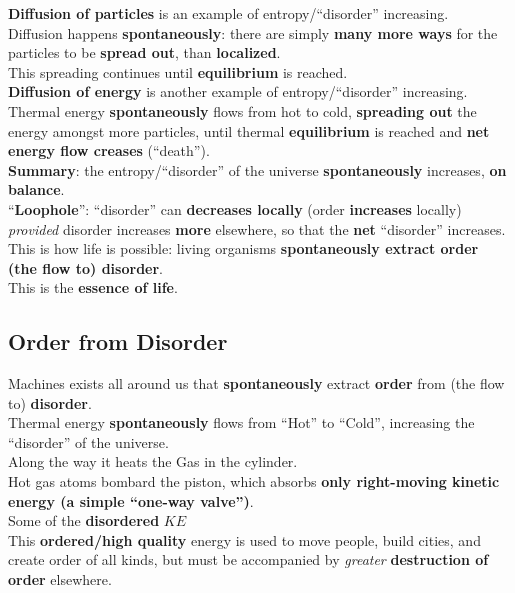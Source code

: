 \documentclass[12pt]{article}
\theoremstyle{definition}
\begin{document}
\textbf{Diffusion of particles} is an example of entropy/``disorder'' increasing. \\
Diffusion happens \textbf{spontaneously}: there are simply \textbf{many more ways} for the particles to be \textbf{spread out}, than \textbf{localized}. \\
This spreading continues until \textbf{equilibrium} is reached. \\

\textbf{Diffusion of energy} is another example of entropy/``disorder'' increasing. \\
Thermal energy \textbf{spontaneously} flows from hot to cold, \textbf{spreading out} the energy amongst more particles, until thermal \textbf{equilibrium} is reached and \textbf{net energy flow creases} (``death''). \\

\textbf{Summary}: the entropy/``disorder'' of the universe \textbf{spontaneously} increases, \textbf{on balance}. \\
``\textbf{Loophole}'': ``disorder'' can \textbf{decreases locally} (order \textbf{increases} locally) \emph{provided} disorder increases \textbf{more} elsewhere, so that the \textbf{net} ``disorder'' increases. \\
This is how life is possible: living organisms \textbf{spontaneously extract order (the flow to) disorder}. \\
This is the \textbf{essence of life}. \\


\subsection{Order from Disorder}
Machines exists all around us that \textbf{spontaneously} extract \textbf{order} from (the flow to) \textbf{disorder}. \\

Thermal energy \textbf{spontaneously} flows from ``Hot'' to ``Cold'', increasing the ``disorder'' of the universe. \\

Along the way it heats the Gas in the cylinder. \\
Hot gas atoms bombard the piston, which absorbs \textbf{only right-moving kinetic energy (a simple ``one-way valve'')}. \\

Some of the \textbf{disordered} $KE$ \\

This \textbf{ordered/high quality} energy is used to move people, build cities, and create order of all kinds, but must be accompanied by \emph{greater} \textbf{destruction of order} elsewhere. \\
\end{document}
